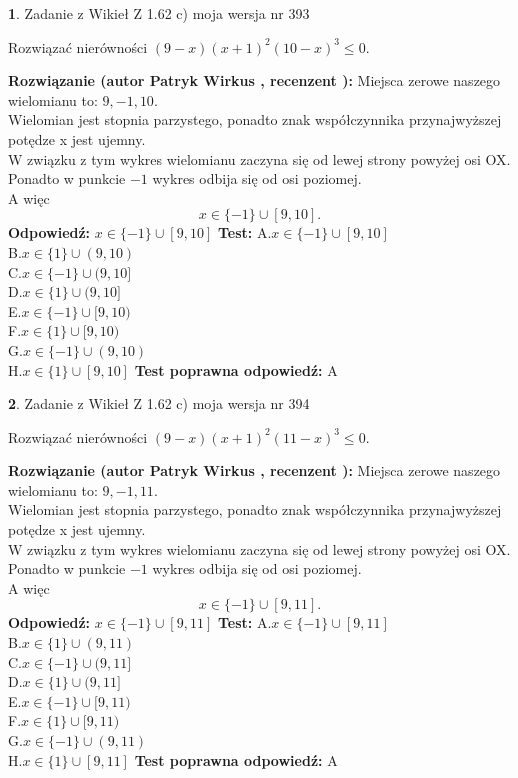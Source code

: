 \documentclass[12pt, a4paper]{article}
\theoremstyle{definition} %
\newtheorem{zad}{}
\newcommand{\zadStart}[1]{\begin{zad}#1\newline}
\newcommand{\zadStop}{\end{zad}}
\newcommand{\rozwStart}[2]{\noindent \textbf{Rozwiązanie (autor #1 , recenzent #2): }\newline}
\newcommand{\rozwStop}{\newline}
\newcommand{\odpStart}{\noindent \textbf{Odpowiedź:}\newline}
\newcommand{\odpStop}{\newline}
\newcommand{\testStart}{\noindent \textbf{Test:}\newline}
\newcommand{\testStop}{\newline}
\newcommand{\kluczStart}{\noindent \textbf{Test poprawna odpowiedź:}\newline}
\newcommand{\kluczStop}{\newline}
\begin{document}
\zadStart{Zadanie z Wikieł Z 1.62 c) moja wersja nr 393}

Rozwiązać nierówności $(9-x)(x+1)^{2}(10-x)^{3}\le0$.
\zadStop
\rozwStart{Patryk Wirkus}{}
Miejsca zerowe naszego wielomianu to: $9, -1, 10$.\\
Wielomian jest stopnia parzystego, ponadto znak współczynnika przy\linebreak najwyższej potędze x jest ujemny.\\ W związku z tym wykres wielomianu zaczyna się od lewej strony powyżej osi OX.\\
Ponadto w punkcie $-1$ wykres odbija się od osi poziomej.\\
A więc $$x \in \{-1\} \cup [9,10].$$
\rozwStop
\odpStart
$x \in \{-1\} \cup [9,10]$
\odpStop
\testStart
A.$x \in \{-1\} \cup [9,10]$\\
B.$x \in \{1\} \cup (9,10)$\\
C.$x \in \{-1\} \cup (9,10]$\\
D.$x \in \{1\} \cup (9,10]$\\
E.$x \in \{-1\} \cup [9,10)$\\
F.$x \in \{1\} \cup [9,10)$\\
G.$x \in \{-1\} \cup (9,10)$\\
H.$x \in \{1\} \cup [9,10]$
\testStop
\kluczStart
A
\kluczStop



\zadStart{Zadanie z Wikieł Z 1.62 c) moja wersja nr 394}

Rozwiązać nierówności $(9-x)(x+1)^{2}(11-x)^{3}\le0$.
\zadStop
\rozwStart{Patryk Wirkus}{}
Miejsca zerowe naszego wielomianu to: $9, -1, 11$.\\
Wielomian jest stopnia parzystego, ponadto znak współczynnika przy\linebreak najwyższej potędze x jest ujemny.\\ W związku z tym wykres wielomianu zaczyna się od lewej strony powyżej osi OX.\\
Ponadto w punkcie $-1$ wykres odbija się od osi poziomej.\\
A więc $$x \in \{-1\} \cup [9,11].$$
\rozwStop
\odpStart
$x \in \{-1\} \cup [9,11]$
\odpStop
\testStart
A.$x \in \{-1\} \cup [9,11]$\\
B.$x \in \{1\} \cup (9,11)$\\
C.$x \in \{-1\} \cup (9,11]$\\
D.$x \in \{1\} \cup (9,11]$\\
E.$x \in \{-1\} \cup [9,11)$\\
F.$x \in \{1\} \cup [9,11)$\\
G.$x \in \{-1\} \cup (9,11)$\\
H.$x \in \{1\} \cup [9,11]$
\testStop
\kluczStart
A
\kluczStop
\end{document}
